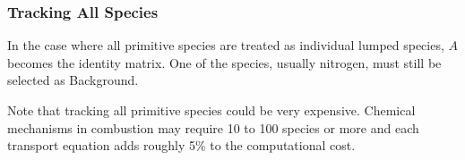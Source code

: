 \subsubsection{Tracking All Species}


In the case where all primitive species are treated as individual lumped species, $A$ becomes the identity matrix.  One of the species, usually nitrogen, must still be selected as Background.

Note that tracking all primitive species could be very expensive.  Chemical mechanisms in combustion may require 10 to 100 species or more and each transport equation adds roughly 5\% to the computational cost.


